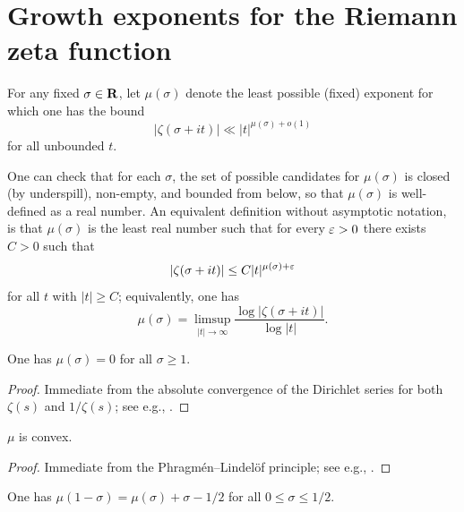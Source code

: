 \chapter{Growth exponents for the Riemann zeta function}\label{zeta-growth-chapter}

\begin{definition}\label{zeta-grow-def}  For any fixed $\sigma \in \mathbf{R}$, let $\mu(\sigma)$ denote the least possible (fixed) exponent for which one has the bound
    $$ |\zeta(\sigma+it)| \ll |t|^{\mu(\sigma)+o(1)}$$
    for all unbounded $t$.
\end{definition}

One can check that for each $\sigma$, the set of possible candidates for $\mu(\sigma)$ is closed (by underspill), non-empty, and bounded from below, so that $\mu(\sigma)$ is well-defined as a real number.  An equivalent definition without asymptotic notation, is that $\mu(\sigma)$ is the least real number such that for every $\varepsilon>0$ there exists $C>0$ such that
$$ |\zeta(\sigma+it)| \leq C |t|^{\mu(\sigma)+\varepsilon}$$
for all $t$ with $|t| \geq C$; equivalently, one has
$$ \mu(\sigma) = \limsup_{|t| \to \infty} \frac{\log |\zeta(\sigma+it)|}{\log|t|}.$$


\begin{lemma}\label{zeta-grow-triv}
    One has $\mu(\sigma)=0$ for all $\sigma \geq 1$.
\end{lemma}


\begin{proof}  Immediate from the absolute convergence of the Dirichlet series for both $\zeta(s)$ and $1/\zeta(s)$; see e.g., \cite[Theorem 1.9]{ivic}.
\end{proof}

\begin{lemma}[Convexity]\label{zeta-convex}
$\mu$ is convex.
\end{lemma}


\begin{proof} Immediate from the Phragm\'en--Lindel\"of principle; see e.g., \cite[\S A.8]{ivic}.
\end{proof}

\begin{lemma}\label{zeta-functional}
    One has $\mu(1-\sigma) = \mu(\sigma) + \sigma - 1/2$ for all $0 \leq \sigma \leq 1/2$.
\end{lemma}


